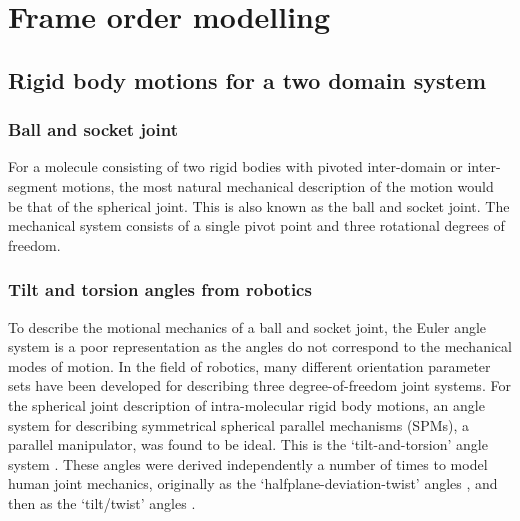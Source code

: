
\section{Frame order modelling}





\subsection{Rigid body motions for a two domain system}





\subsubsection{Ball and socket joint}

For a molecule consisting of two rigid bodies with pivoted inter-domain or inter-segment motions, the most natural mechanical description of the motion would be that of the spherical joint.
This is also known as the ball and socket joint.
The mechanical system consists of a single pivot point and three rotational degrees of freedom.




\subsubsection{Tilt and torsion angles from robotics}

To describe the motional mechanics of a ball and socket joint, the Euler angle system is a poor representation as the angles do not correspond to the mechanical modes of motion.
In the field of robotics, many different orientation parameter sets have been developed for describing three degree-of-freedom joint systems.
For the spherical joint description of intra-molecular rigid body motions, an angle system for describing symmetrical spherical parallel mechanisms (SPMs), a parallel manipulator, was found to be ideal.
This is the `tilt-and-torsion' angle system \citep{Huang99,BonevGosselin06}.
These angles were derived independently a number of times to model human joint mechanics, originally as the `halfplane-deviation-twist' angles \citep{Korein85}, and then as the `tilt/twist' angles \citep{Crawford99}.

